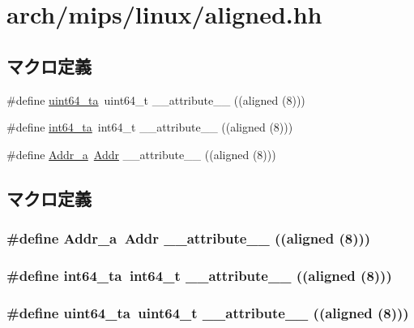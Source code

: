 \hypertarget{aligned_8hh}{
\section{arch/mips/linux/aligned.hh}
\label{aligned_8hh}
}
\subsection*{マクロ定義}
\begin{DoxyCompactItemize}
\item 
\#define \hyperlink{aligned_8hh_a5972d7b2f73e6a26b2f6afdf375bce72}{uint64\_\-ta}~uint64\_\-t \_\-\_\-attribute\_\-\_\- ((aligned (8)))
\item 
\#define \hyperlink{aligned_8hh_afc5a70d13a417d01bc420f5f5554f21c}{int64\_\-ta}~int64\_\-t \_\-\_\-attribute\_\-\_\- ((aligned (8)))
\item 
\#define \hyperlink{aligned_8hh_a69433aca213e8661b987eaebd46bcc18}{Addr\_\-a}~\hyperlink{base_2types_8hh_af1bb03d6a4ee096394a6749f0a169232}{Addr} \_\-\_\-attribute\_\-\_\- ((aligned (8)))
\end{DoxyCompactItemize}


\subsection{マクロ定義}
\hypertarget{aligned_8hh_a69433aca213e8661b987eaebd46bcc18}{
\subsubsection[{Addr\_\-a}]{\setlength{\rightskip}{0pt plus 5cm}\#define Addr\_\-a~{\bf Addr} \_\-\_\-attribute\_\-\_\- ((aligned (8)))}}
\label{aligned_8hh_a69433aca213e8661b987eaebd46bcc18}
\hypertarget{aligned_8hh_afc5a70d13a417d01bc420f5f5554f21c}{
\subsubsection[{int64\_\-ta}]{\setlength{\rightskip}{0pt plus 5cm}\#define int64\_\-ta~int64\_\-t \_\-\_\-attribute\_\-\_\- ((aligned (8)))}}
\label{aligned_8hh_afc5a70d13a417d01bc420f5f5554f21c}
\hypertarget{aligned_8hh_a5972d7b2f73e6a26b2f6afdf375bce72}{
\subsubsection[{uint64\_\-ta}]{\setlength{\rightskip}{0pt plus 5cm}\#define uint64\_\-ta~uint64\_\-t \_\-\_\-attribute\_\-\_\- ((aligned (8)))}}
\label{aligned_8hh_a5972d7b2f73e6a26b2f6afdf375bce72}
